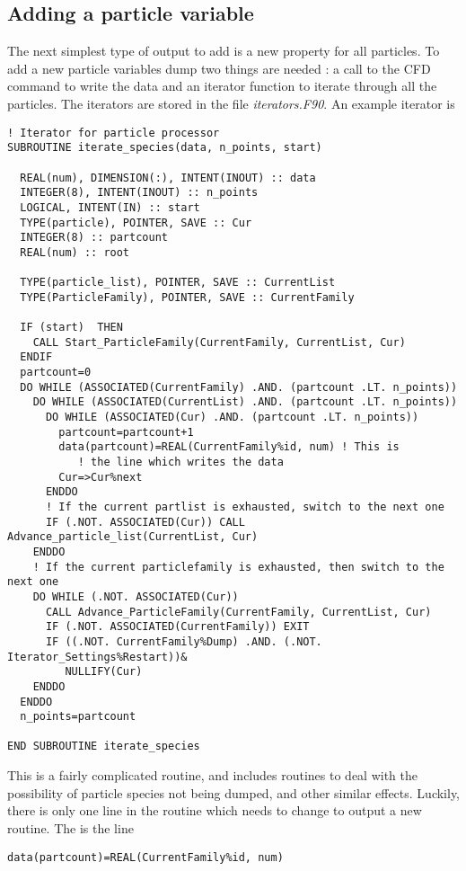 \documentclass[12pt,a4paper]{article}
\newcommand{\simpleboxverbatim}{\begin{Verbatim}[obeytabs=true,frame=single,
  framerule=0.5mm,rulecolor=\color{warwickmid},formatcom=\color{black}]}
\begin{document}
\subsection{Adding a particle variable}
The next simplest type of output to add is a new property for all particles. To
add a new particle variables dump two things are needed : a call to the CFD
command to write the data and an iterator function to iterate through all the
particles. The iterators are stored in the file {\it iterators.F90}. An example
iterator is

\simpleboxverbatim
! Iterator for particle processor
SUBROUTINE iterate_species(data, n_points, start)

  REAL(num), DIMENSION(:), INTENT(INOUT) :: data
  INTEGER(8), INTENT(INOUT) :: n_points
  LOGICAL, INTENT(IN) :: start
  TYPE(particle), POINTER, SAVE :: Cur
  INTEGER(8) :: partcount
  REAL(num) :: root

  TYPE(particle_list), POINTER, SAVE :: CurrentList
  TYPE(ParticleFamily), POINTER, SAVE :: CurrentFamily

  IF (start)  THEN
    CALL Start_ParticleFamily(CurrentFamily, CurrentList, Cur)
  ENDIF
  partcount=0
  DO WHILE (ASSOCIATED(CurrentFamily) .AND. (partcount .LT. n_points))
    DO WHILE (ASSOCIATED(CurrentList) .AND. (partcount .LT. n_points))
      DO WHILE (ASSOCIATED(Cur) .AND. (partcount .LT. n_points))
        partcount=partcount+1
        data(partcount)=REAL(CurrentFamily%id, num) ! This is
           ! the line which writes the data
        Cur=>Cur%next
      ENDDO
      ! If the current partlist is exhausted, switch to the next one
      IF (.NOT. ASSOCIATED(Cur)) CALL Advance_particle_list(CurrentList, Cur)
    ENDDO
    ! If the current particlefamily is exhausted, then switch to the next one
    DO WHILE (.NOT. ASSOCIATED(Cur))
      CALL Advance_ParticleFamily(CurrentFamily, CurrentList, Cur)
      IF (.NOT. ASSOCIATED(CurrentFamily)) EXIT
      IF ((.NOT. CurrentFamily%Dump) .AND. (.NOT. Iterator_Settings%Restart))&
         NULLIFY(Cur)
    ENDDO
  ENDDO
  n_points=partcount

END SUBROUTINE iterate_species
\end{Verbatim}

This is a fairly complicated routine, and includes routines to deal with the
possibility of particle species not being dumped, and other similar
effects. Luckily, there is only one line in the routine which needs to change
to output a new routine. The is the line
\simpleboxverbatim
             data(partcount)=REAL(CurrentFamily%
\end{Verbatim}
\end{document}
